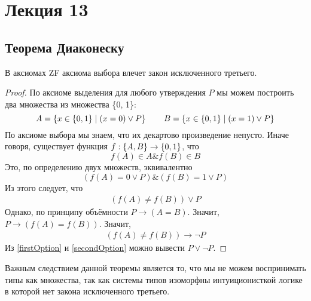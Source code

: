 \section{Лекция 13}

\subsection{Теорема Диаконеску}
\begin{theorem}[Диаконеску]
    В аксиомах ZF аксиома выбора влечет закон исключенного третьего.
\end{theorem}

\begin{proof}

По аксиоме выделения для любого утверждения $P$ мы можем построить два множества из множества \{0, 1\}:
\[
    A = \left\{x \in \left\{0, 1\right\} \mid \left(x = 0\right) \lor P\right\} \qquad
    B = \left\{x \in \left\{0, 1\right\} \mid \left(x = 1\right) \lor P\right\}
\]
По аксиоме выбора мы знаем, что их декартово произведение непусто.
Иначе говоря, существует функция $f : \left\{A, B\right\} \to \left\{0, 1\right\}$, что
\[
    f(A) \in A \& f(B) \in B
\]
Это, по определению двух множеств, эквивалентно
\[
    \left(f(A) = 0 \vee P\right) \& \left(f(B) = 1 \vee P\right)
\]
Из этого следует, что
\begin{gather}
    \left(f(A) \neq f(B)\right) \vee P \label{firstOption} \tag{$*$}
\end{gather}
Однако, по принципу объёмности $P \to \left(A=B\right)$. Значит, $P \to \left(f(A) = f(B)\right)$. Значит,
\begin{gather}
    \left(f(A) \neq f(B)\right) \to \neg P \label{secondOption} \tag{$**$}
\end{gather}
Из \ref{firstOption} и \ref{secondOption} можно вывести $P \vee \neg P$.

\end{proof}

Важным следствием данной теоремы является то, что мы не можем воспринимать типы как множества, так как системы типов изоморфны интуиционисткой логике в которой нет закона исключенного третьего.
